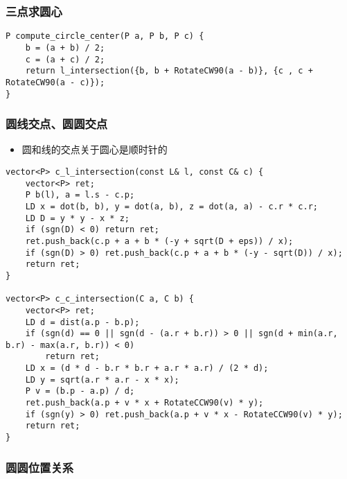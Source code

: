 \documentclass[]{article}
\providecommand{\tightlist}{%
  \setlength{\itemsep}{0pt}\setlength{\parskip}{0pt}}
\begin{document}
\hypertarget{ux4e09ux70b9ux6c42ux5706ux5fc3}{%
\subsubsection{三点求圆心}\label{ux4e09ux70b9ux6c42ux5706ux5fc3}}

\begin{verbatim}
P compute_circle_center(P a, P b, P c) {
    b = (a + b) / 2;
    c = (a + c) / 2;
    return l_intersection({b, b + RotateCW90(a - b)}, {c , c + RotateCW90(a - c)});
}
\end{verbatim}

\hypertarget{ux5706ux7ebfux4ea4ux70b9ux5706ux5706ux4ea4ux70b9}{%
\subsubsection{圆线交点、圆圆交点}\label{ux5706ux7ebfux4ea4ux70b9ux5706ux5706ux4ea4ux70b9}}

\begin{itemize}
\tightlist
\item
  圆和线的交点关于圆心是顺时针的
\end{itemize}

\begin{verbatim}
vector<P> c_l_intersection(const L& l, const C& c) {
    vector<P> ret;
    P b(l), a = l.s - c.p;
    LD x = dot(b, b), y = dot(a, b), z = dot(a, a) - c.r * c.r;
    LD D = y * y - x * z;
    if (sgn(D) < 0) return ret;
    ret.push_back(c.p + a + b * (-y + sqrt(D + eps)) / x);
    if (sgn(D) > 0) ret.push_back(c.p + a + b * (-y - sqrt(D)) / x);
    return ret;
}

vector<P> c_c_intersection(C a, C b) {
    vector<P> ret;
    LD d = dist(a.p - b.p);
    if (sgn(d) == 0 || sgn(d - (a.r + b.r)) > 0 || sgn(d + min(a.r, b.r) - max(a.r, b.r)) < 0)
        return ret;
    LD x = (d * d - b.r * b.r + a.r * a.r) / (2 * d);
    LD y = sqrt(a.r * a.r - x * x);
    P v = (b.p - a.p) / d;
    ret.push_back(a.p + v * x + RotateCCW90(v) * y);
    if (sgn(y) > 0) ret.push_back(a.p + v * x - RotateCCW90(v) * y);
    return ret;
}
\end{verbatim}

\hypertarget{ux5706ux5706ux4f4dux7f6eux5173ux7cfb}{%
\subsubsection{圆圆位置关系}\label{ux5706ux5706ux4f4dux7f6eux5173ux7cfb}}
\end{document}
